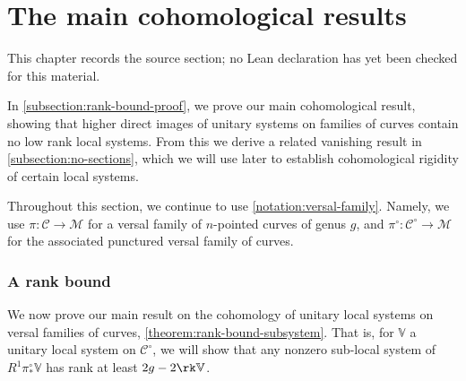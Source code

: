 \chapter{The main cohomological results}
\label{canonical-representations-surface-groups-chapter-06}

\begin{remark}
\label{canonical-representations-surface-groups-chapter-06-source}
This chapter records the source section; no Lean declaration has yet been checked for this material.
\notready
\end{remark}

\label{section:vanishing}

In \autoref{subsection:rank-bound-proof}, we prove our main cohomological result, showing that higher direct images of
unitary systems on families of curves contain no low rank local systems.
From this we derive a related vanishing result in \autoref{subsection:no-sections},
which we will use later to establish cohomological rigidity of certain local systems.


Throughout this section, we continue to use \autoref{notation:versal-family}.
Namely, we use $\pi:\mathscr{C}\to \mathscr{M}$ for a versal family of
$n$-pointed curves of genus $g$, and $\pi^\circ: \mathscr{C}^\circ \to \mathscr{M}$ for the
associated punctured versal family of curves.

\subsection{A rank bound}
\label{subsection:rank-bound-proof}
We now prove our main result on the cohomology of unitary local systems on versal families of curves,
\autoref{theorem:rank-bound-subsystem}.
That is, for $\mathbb V$ a unitary local system on $\mathscr C^\circ$, we
will show that any nonzero
sub-local system of $R^1 \pi^\circ_* \mathbb V$ has rank at
least $2g-2\rk\mathbb{V}$.

